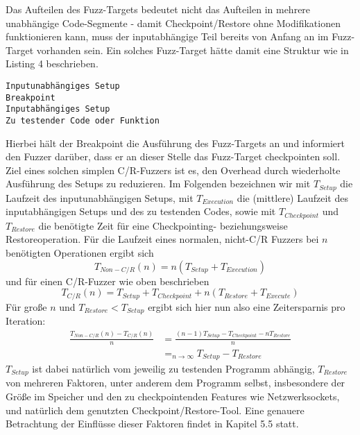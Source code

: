 \documentclass[a4paper]{article}
\begin{document}
Das Aufteilen des Fuzz-Targets bedeutet nicht das Aufteilen in mehrere unabhängige Code-Segmente - damit Checkpoint/Restore ohne Modifikationen funktionieren kann, muss der inputabhängige Teil bereits von Anfang an im Fuzz-Target vorhanden sein. 
Ein solches Fuzz-Target hätte damit eine Struktur wie in Listing 4 beschrieben.
\begin{lstlisting}[caption=Struktur C/R-Fuzzer-Fuzz-Target]
Inputunabhängiges Setup
Breakpoint
Inputabhängiges Setup
Zu testender Code oder Funktion
\end{lstlisting}
Hierbei hält der Breakpoint die Ausführung des Fuzz-Targets an und informiert den Fuzzer darüber, dass er an dieser Stelle das Fuzz-Target checkpointen soll.\\
Ziel eines solchen simplen C/R-Fuzzers ist es, den Overhead durch wiederholte Ausführung des Setups zu reduzieren.
Im Folgenden bezeichnen wir mit $T_{Setup}$ die Laufzeit des inputunabhängigen Setups, mit $T_{Execution}$ die (mittlere) Laufzeit des inputabhängigen Setups und des zu testenden Codes, sowie mit $T_{Checkpoint}$ und $T_{Restore}$ die benötigte Zeit für eine Checkpointing- beziehungsweise Restoreoperation. 
Für die Laufzeit eines normalen, nicht-C/R Fuzzers bei $n$ benötigten Operationen ergibt sich
\begin{equation}
    T_{Non-C/R}(n) = n (T_{Setup} + T_{Execution})
\end{equation}
und für einen C/R-Fuzzer wie oben beschrieben
\begin{equation}
    T_{C/R}(n) = T_{Setup} + T_{Checkpoint} + n (T_{Restore} + T_{Execute})
\end{equation}
Für große $n$ und $T_{Restore} < T_{Setup}$ ergibt sich hier nun also eine Zeitersparnis pro Iteration:
\begin{equation}
    \begin{split}
        \frac{T_{Non-C/R}(n) - T_{C/R}(n)}{n} &= \frac{(n-1) T_{Setup} - T_{Checkpoint} - n T_{Restore}}{n} \\
        &=_{n \to \infty} T_{Setup} - T_{Restore}
    \end{split}
\end{equation}
$T_{Setup}$ ist dabei natürlich vom jeweilig zu testenden Programm abhängig, $T_{Restore}$ von mehreren Faktoren, unter anderem dem Programm selbst, insbesondere der Größe im Speicher und den zu checkpointenden Features wie Netzwerksockets, und natürlich dem genutzten Checkpoint/Restore-Tool. Eine genauere Betrachtung der Einflüsse dieser Faktoren findet in Kapitel 5.5 statt.
\end{document}
